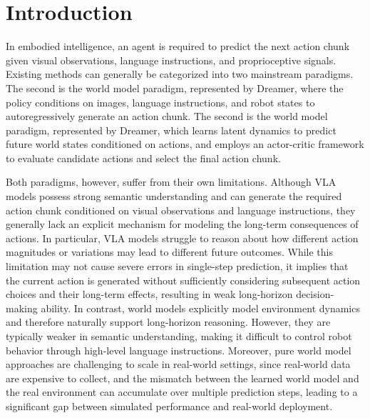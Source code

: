 \section{Introduction}

In embodied intelligence, an agent is required to predict the next action chunk given visual observations, language instructions, and proprioceptive signals. Existing methods can generally be categorized into two mainstream paradigms. The second is the world model paradigm, represented by Dreamer, where the policy conditions on images, language instructions, and robot states to autoregressively generate an action chunk. The second is the world model paradigm, represented by Dreamer, which learns latent dynamics to predict future world states conditioned on actions, and employs an actor-critic framework to evaluate candidate actions and select the final action chunk.

Both paradigms, however, suffer from their own limitations. Although VLA models possess strong semantic understanding and can generate the required action chunk conditioned on visual observations and language instructions, they generally lack an explicit mechanism for modeling the long-term consequences of actions. In particular, VLA models struggle to reason about how different action magnitudes or variations may lead to different future outcomes. While this limitation may not cause severe errors in single-step prediction, it implies that the current action is generated without sufficiently considering subsequent action choices and their long-term effects, resulting in weak long-horizon decision-making ability. In contrast, world models explicitly model environment dynamics and therefore naturally support long-horizon reasoning. However, they are typically weaker in semantic understanding, making it difficult to control robot behavior through high-level language instructions. Moreover, pure world model approaches are challenging to scale in real-world settings, since real-world data are expensive to collect, and the mismatch between the learned world model and the real environment can accumulate over multiple prediction steps, leading to a significant gap between simulated performance and real-world deployment.

